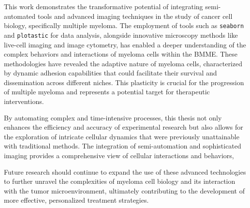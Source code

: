 

%
\label{sec:discussion_overall_conclusion}%






This work demonstrates the transformative potential of integrating
semi-automated tools and advanced imaging techniques in the study of cancer cell
biology, specifically multiple myeloma. The employment of tools such as
\texttt{seaborn} and \texttt{plotastic} for data analysis, alongside innovative
microscopy methods like live-cell imaging and image cytometry, has enabled a
deeper understanding of the complex behaviors and interactions of myeloma cells
within the \acf{BMME}. These methodologies have revealed the adaptive nature of
myeloma cells, characterized by dynamic adhesion capabilities that could
facilitate their survival and dissemination across different niches. This
plasticity is crucial for the progression of multiple myeloma and represents a
potential target for therapeutic interventions.

By automating complex and time-intensive processes, this thesis not only
enhances the efficiency and accuracy of experimental research but also allows
for the exploration of intricate cellular dynamics that were previously
unattainable with traditional methods. The integration of semi-automation and
sophisticated imaging provides a comprehensive view of cellular interactions and
behaviors, 

Future research should continue
to expand the use of these advanced technologies to further unravel the
complexities of myeloma cell biology and its interaction with the tumor
microenvironment, ultimately contributing to the development of more effective,
personalized treatment strategies.

